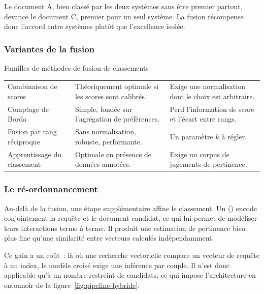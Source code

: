 Le document A, bien classé par les deux systèmes sans être premier partout,
devance le document C, premier pour un seul système. La fusion récompense donc
l'accord entre systèmes plutôt que l'excellence isolée.

\subsubsection{Variantes de la fusion}

\begin{btptable}{Familles de méthodes de fusion de classements}
\label{tab:familles-fusion}
\begin{tabularx}{\linewidth}{@{}L{3.1cm} Y Y@{}}
\toprule
{}
 &  &  \\
\midrule
Combinaison de scores & Théoriquement optimale si les scores sont calibrés. & Exige une normalisation dont le choix est arbitraire. \\
Comptage de Borda & Simple, fondée sur l'agrégation de préférences. & Perd l'information de score et l'écart entre rangs. \\
Fusion par rang réciproque & Sans normalisation, robuste, performante. & Un paramètre $k$ à régler. \\
Apprentissage du classement & Optimale en présence de données annotées. & Exige un corpus de jugements de pertinence. \\
\bottomrule
\end{tabularx}
\end{btptable}

\subsubsection{Le ré-ordonnancement}

Au-delà de la fusion, une étape supplémentaire affine le classement. Un
 () encode conjointement la
requête et le document candidat, ce qui lui permet de modéliser leurs
interactions terme à terme. Il produit une estimation de pertinence bien plus
fine qu'une similarité entre vecteurs calculés indépendamment.

Ce gain a un coût~: là où une recherche vectorielle compare un vecteur de
requête à un index, le modèle croisé exige une inférence par couple. Il n'est
donc applicable qu'à un nombre restreint de candidats, ce qui impose
l'architecture en entonnoir de la figure~\ref{fig:pipeline-hybride}.

